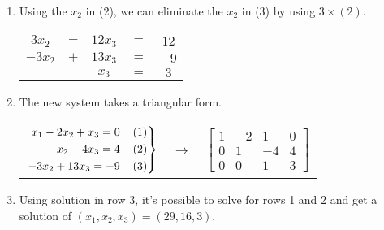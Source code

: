 \documentclass{article}
\newenvironment{rcases}
  {\left.\begin{aligned}}
  {\end{aligned}\right\rbrace}
\begin{document}
\begin{enumerate}
    \item Using the $x_2$ in (2), we can eliminate the $x_2$ in (3) by using $3 \times (2)$.
    \begin{center}
        \begin{tabular}{c c c c c}
            $3x_2$ & $-$ & $12x_3$ & $=$ & $12$ \\
            $-3x_2$ & $+$ & $13x_3$ & $=$ & $-9$ \\
            \hline
            & & $x_3$ & $=$ & $3$ \\
        \end{tabular}
    \end{center}

    \item The new system takes a triangular form.
    \begin{center}
        \begin{tabular}{c c c}

            $\begin{rcases}
            x_1 - 2x_2 + x_3 = 0 \hspace{4mm} (1) \\  
            x_2 - 4x_3 = 4 \hspace{4mm} (2) \\
            -3x_2 + 13x_3 = -9 \hspace{4mm} (3) \\ 
            \end{rcases}$

            & $\rightarrow$ &

            $\begin{bmatrix}
                1 & -2 & 1 & 0 \\
                0 & 1 & -4 & 4 \\
                0 & 0 & 1 & 3
            \end{bmatrix}$

        \end{tabular}
    \end{center}

    \item Using solution in row 3, it's possible to solve for rows 1 and 2 and get a solution of $(x_1, x_2, x_3) = (29, 16, 3)$.

\end{enumerate}
\end{document}
